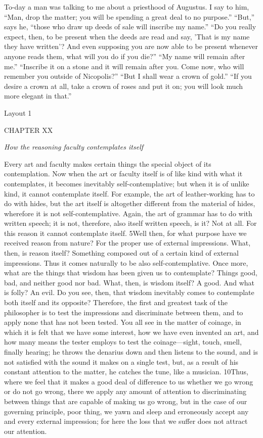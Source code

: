 To-day a man was talking to me about a priesthood of Augustus. I say to him, ``Man, drop the matter; you will be spending a great deal to no purpose.'' ``But,'' says he, ``those who draw up deeds of sale will inscribe my name.'' ``Do you really expect, then, to be present when the deeds are read and say, 'That is my name they have written'? And even supposing you are now able to be present whenever anyone reads them, what will you do if you die?'' ``My name will remain after me.'' ``Inscribe it on a stone and it will remain after you. Come now, who will remember you outside of Nicopolis?'' ``But I shall wear a crown of gold.'' ``If you desire a crown at all, take a crown of roses and put it on; you will look much more elegant in that.''



Layout 1

CHAPTER XX

\emph{How the reasoning faculty contemplates itself}

Every art and faculty makes certain things the special object of its contemplation. Now when the art or faculty itself is of like kind with what it contemplates, it becomes inevitably self-contemplative; but when it is of unlike kind, it cannot contemplate itself. For example, the art of leather-working has to do with hides, but the art itself is altogether different from the material of hides, wherefore it is not self-contemplative. Again, the art of grammar has to do with written speech; it is not, therefore, also itself written speech, is it? Not at all. For this reason it cannot contemplate itself. 5Well then, for what purpose have we received reason from nature? For the proper use of external impressions. What, then, is reason itself? Something composed out of a certain kind of external impressions. Thus it comes naturally to be also self-contemplative. Once more, what are the things that wisdom has been given us to contemplate? Things good, bad, and neither good nor bad. What, then, is wisdom itself? A good. And what is folly? An evil. Do you see, then, that wisdom inevitably comes to contemplate both itself and its opposite? Therefore, the first and greatest task of the philosopher is to test the impressions and discriminate between them, and to apply none that has not been tested. You all see in the matter of coinage, in which it is felt that we have some interest, how we have even invented an art, and how many means the tester employs to test the coinage—sight, touch, smell, finally hearing; he throws the denarius down and then listens to the sound, and is not satisfied with the sound it makes on a single test, but, as a result of his constant attention to the matter, he catches the tune, like a musician. 10Thus, where we feel that it makes a good deal of difference to us whether we go wrong or do not go wrong, there we apply any amount of attention to discriminating between things that are capable of making us go wrong, but in the case of our governing principle, poor thing, we yawn and sleep and erroneously accept any and every external impression; for here the loss that we suffer does not attract our attention.


